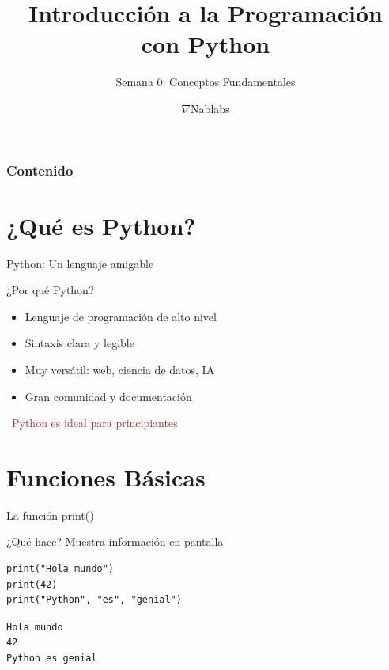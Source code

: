 \documentclass{beamer}
\title{\textbf{Introducción a la Programación con Python}}
\subtitle{Semana 0: Conceptos Fundamentales}
\author{$\nabla$Nablabs}
\date{}
\begin{document}
\begin{frame}
\titlepage
\end{frame}

\begin{frame}
\frametitle{Contenido}
\tableofcontents
\end{frame}

\section{¿Qué es Python?}

\begin{frame}{Python: Un lenguaje amigable}
\begin{conceptbox}{¿Por qué Python?}
\small
\begin{itemize}
    \item[\faCheckCircle] Lenguaje de programación de alto nivel
    \item[\faCheckCircle] Sintaxis clara y legible
    \item[\faCheckCircle] Muy versátil: web, ciencia de datos, IA
    \item[\faCheckCircle] Gran comunidad y documentación
\end{itemize}
\end{conceptbox}

\vspace{0.2cm}
\begin{center}
\large\textcolor{brown}{\faCode \ Python es ideal para principiantes}
\end{center}
\end{frame}

\section{Funciones Básicas}

\begin{frame}[fragile]{La función print() \ \faTerminal}

\begin{conceptbox}{¿Qué hace?}
Muestra información en pantalla
\end{conceptbox}

\vspace{-0.2cm}
\begin{lstlisting}
print("Hola mundo")
print(42)
print("Python", "es", "genial")
\end{lstlisting}

\vspace{-0.2cm}
\begin{tcolorbox}[colback=green!10,colframe=green,title={\small\faArrowCircleRight \ Salida},coltitle=fg0,left=3pt,right=3pt,top=2pt,bottom=2pt,boxsep=1pt]
\small\texttt{Hola mundo\\
42\\
Python es genial}
\end{tcolorbox}
\end{frame}
\end{document}
